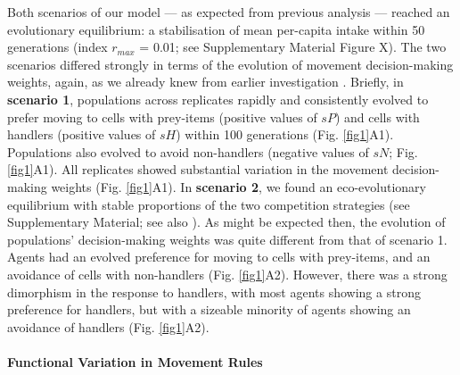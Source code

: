    Both scenarios of our model --- as expected from previous analysis \citep{gupte2021a} --- reached an evolutionary equilibrium: a stabilisation of mean per-capita intake within 50 generations (index $r_{max}$ = 0.01; see Supplementary Material Figure X).
    The two scenarios differed strongly in terms of the evolution of movement decision-making weights, again, as we already knew from earlier investigation \citep{gupte2021a}.
    Briefly, in \textbf{scenario 1}, populations across replicates rapidly and consistently evolved to prefer moving to cells with prey-items (positive values of $sP$) and cells with handlers (positive values of $sH$) within 100 generations (Fig. \ref{fig1}A1).
    Populations also evolved to avoid non-handlers (negative values of $sN$; Fig. \ref{fig1}A1).
    All replicates showed substantial variation in the movement decision-making weights (Fig. \ref{fig1}A1).
    In \textbf{scenario 2}, we found an eco-evolutionary equilibrium with stable proportions of the two competition strategies (see Supplementary Material; see also \citealt{gupte2021a}).
    As might be expected then, the evolution of populations' decision-making weights was quite different from that of scenario 1.
    Agents had an evolved preference for moving to cells with prey-items, and an avoidance of cells with non-handlers (Fig. \ref{fig1}A2).
    However, there was a strong dimorphism in the response to handlers, with most agents showing a strong preference for handlers, but with a sizeable minority of agents showing an avoidance of handlers (Fig. \ref{fig1}A2).
    
    \paragraph{Functional Variation in Movement Rules}
    
